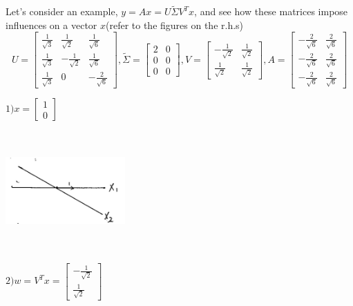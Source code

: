 \vspace{0.5cm}
\begin{example}
	Let's consider an example, $y = Ax = U\tilde{\Sigma} V^Tx$, and see how these matrices impose influences on a vector $x$(refer to the figures on the r.h.s)
	$$U = 
	\left[
	\begin{matrix}
	\frac{1}{\sqrt{3}}&\frac{1}{\sqrt{2}} & \frac{1}{\sqrt{6}}\\
	\frac{1}{\sqrt{3}}&-\frac{1}{\sqrt{2}} & \frac{1}{\sqrt{6}}\\
	\frac{1}{\sqrt{3}}&0 & -\frac{2}{\sqrt{6}}
	\end{matrix}
	\right]
	 ,
	\tilde{\Sigma} = 
	\left[
	\begin{matrix}
	2&0\\
	0&0\\
	0&0
	\end{matrix}
	\right] 
	,
	V = 
	\left[
	\begin{matrix}
	-\frac{1}{\sqrt{2}}&\frac{1}{\sqrt{2}}\\
	\frac{1}{\sqrt{2}}&\frac{1}{\sqrt{2}}
	\end{matrix}
	\right] 
	,
	A = 
	\left[
	\begin{matrix}
	-\frac{2}{\sqrt{6}}&\frac{2}{\sqrt{6}}\\
	-\frac{2}{\sqrt{6}}&\frac{2}{\sqrt{6}}\\
	-\frac{2}{\sqrt{6}}&\frac{2}{\sqrt{6}}
	\end{matrix}
	\right]
	$$
	
$ 1) x = 
	\left[
	\begin{matrix}
	1\\
	0
	\end{matrix}
	\right]
$
	\begin{marginfigure}
		\centering
		\includegraphics[width=1.8in,height=1.8in]{figures/ch05/figure1_a.jpg}
	\end{marginfigure}


$ 2) w = V^Tx = 
	\left[
	\begin{matrix}
	-\frac{1}{\sqrt{2}}\\
	\frac{1}{\sqrt{2}}
	\end{matrix}
	\right]
$
	


\end{example}
